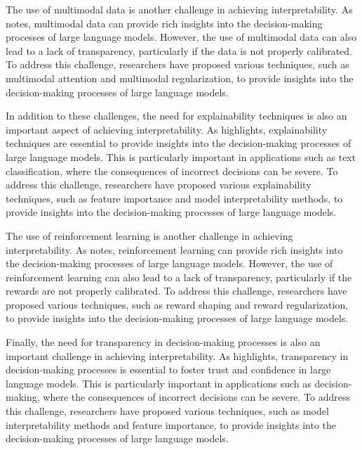 \documentclass[11pt]{article}
\begin{document}
The use of multimodal data is another challenge in achieving interpretability. As \cite{ref269} notes, multimodal data can provide rich insights into the decision-making processes of large language models. However, the use of multimodal data can also lead to a lack of transparency, particularly if the data is not properly calibrated. To address this challenge, researchers have proposed various techniques, such as multimodal attention and multimodal regularization, to provide insights into the decision-making processes of large language models.

In addition to these challenges, the need for explainability techniques is also an important aspect of achieving interpretability. As \cite{ref270} highlights, explainability techniques are essential to provide insights into the decision-making processes of large language models. This is particularly important in applications such as text classification, where the consequences of incorrect decisions can be severe. To address this challenge, researchers have proposed various explainability techniques, such as feature importance and model interpretability methods, to provide insights into the decision-making processes of large language models.

The use of reinforcement learning is another challenge in achieving interpretability. As \cite{ref271} notes, reinforcement learning can provide rich insights into the decision-making processes of large language models. However, the use of reinforcement learning can also lead to a lack of transparency, particularly if the rewards are not properly calibrated. To address this challenge, researchers have proposed various techniques, such as reward shaping and reward regularization, to provide insights into the decision-making processes of large language models.

Finally, the need for transparency in decision-making processes is also an important challenge in achieving interpretability. As \cite{ref272} highlights, transparency in decision-making processes is essential to foster trust and confidence in large language models. This is particularly important in applications such as decision-making, where the consequences of incorrect decisions can be severe. To address this challenge, researchers have proposed various techniques, such as model interpretability methods and feature importance, to provide insights into the decision-making processes of large language models.
\end{document}
